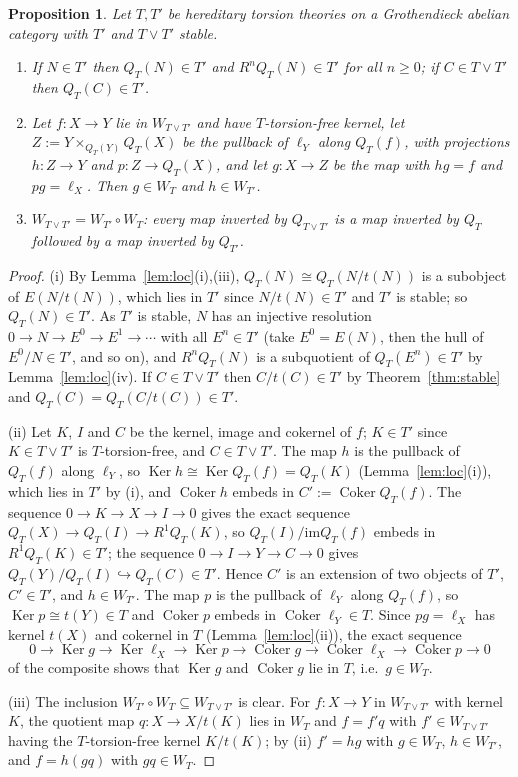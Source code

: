 \documentclass[11pt]{amsart}
\newtheorem{prop}[thm]{Proposition}
\theoremstyle{definition}
\newcommand{\im}{\mathrm{im}}
\begin{document}
\begin{prop}\label{prop:twostep}
Let $T,T'$ be hereditary torsion theories on a Grothendieck abelian
category with $T'$ and $T\vee T'$ stable.
\begin{enumerate}
\item[(i)] If $N\in T'$ then $Q_T(N)\in T'$ and $R^nQ_T(N)\in T'$ for all
$n\ge0$; if $C\in T\vee T'$ then $Q_T(C)\in T'$.
\item[(ii)] Let $f\colon X\to Y$ lie in $W_{T\vee T'}$ and have
$T$-torsion-free kernel, let $Z:=Y\times_{Q_T(Y)}Q_T(X)$ be the pullback of
$\ell_Y$ along $Q_T(f)$, with projections $h\colon Z\to Y$ and $p\colon Z\to
Q_T(X)$, and let $g\colon X\to Z$ be the map with $hg=f$ and $pg=\ell_X$.
Then $g\in W_T$ and $h\in W_{T'}$.
\item[(iii)] $W_{T\vee T'}=W_{T'}\circ W_T$: every map inverted by
$Q_{T\vee T'}$ is a map inverted by $Q_T$ followed by a map inverted by
$Q_{T'}$.
\end{enumerate}
\end{prop}
\begin{proof}
(i) By Lemma~\ref{lem:loc}(i),(iii), $Q_T(N)\cong Q_T(N/t(N))$ is a
subobject of $E(N/t(N))$, which lies in $T'$ since $N/t(N)\in T'$ and $T'$
is stable; so $Q_T(N)\in T'$. As $T'$ is stable, $N$ has an injective
resolution $0\to N\to E^0\to E^1\to\cdots$ with all $E^n\in T'$ (take
$E^0=E(N)$, then the hull of $E^0/N\in T'$, and so on), and $R^nQ_T(N)$ is
a subquotient of $Q_T(E^n)\in T'$ by Lemma~\ref{lem:loc}(iv). If
$C\in T\vee T'$ then $C/t(C)\in T'$ by Theorem~\ref{thm:stable} and
$Q_T(C)=Q_T(C/t(C))\in T'$.

(ii) Let $K$, $I$ and $C$ be the kernel, image and cokernel of $f$; $K\in
T'$ since $K\in T\vee T'$ is $T$-torsion-free, and $C\in T\vee T'$. The map
$h$ is the pullback of $Q_T(f)$ along $\ell_Y$, so $\operatorname{Ker}h\cong
\operatorname{Ker}Q_T(f)=Q_T(K)$ (Lemma~\ref{lem:loc}(i)), which lies in $T'$
by (i), and
$\operatorname{Coker}h$ embeds in $C':=\operatorname{Coker}Q_T(f)$. The
sequence $0\to K\to X\to I\to0$ gives the exact sequence $Q_T(X)\to Q_T(I)
\to R^1Q_T(K)$, so $Q_T(I)/\im Q_T(f)$ embeds in $R^1Q_T(K)\in T'$; the
sequence $0\to I\to Y\to C\to0$ gives $Q_T(Y)/Q_T(I)\hookrightarrow Q_T(C)
\in T'$. Hence $C'$ is an extension of two objects of $T'$, $C'\in T'$, and
$h\in W_{T'}$. The map $p$ is the pullback of $\ell_Y$ along $Q_T(f)$, so
$\operatorname{Ker}p\cong t(Y)\in T$ and $\operatorname{Coker}p$ embeds in
$\operatorname{Coker}\ell_Y\in T$. Since $pg=\ell_X$ has kernel $t(X)$ and
cokernel in $T$ (Lemma~\ref{lem:loc}(ii)), the exact sequence
\[
0\to\operatorname{Ker}g\to\operatorname{Ker}\ell_X\to\operatorname{Ker}p\to
\operatorname{Coker}g\to\operatorname{Coker}\ell_X\to\operatorname{Coker}p\to0
\]
of the composite shows that $\operatorname{Ker}g$ and $\operatorname{Coker}g$
lie in $T$, i.e.\ $g\in W_T$.

(iii) The inclusion $W_{T'}\circ W_T\subseteq W_{T\vee T'}$ is clear. For
$f\colon X\to Y$ in $W_{T\vee T'}$ with kernel $K$, the quotient map
$q\colon X\to X/t(K)$ lies in $W_T$ and $f=f'q$ with $f'\in W_{T\vee T'}$
having the $T$-torsion-free kernel $K/t(K)$; by (ii) $f'=hg$ with $g\in W_T$,
$h\in W_{T'}$, and $f=h(gq)$ with $gq\in W_T$.
\end{proof}
\end{document}
